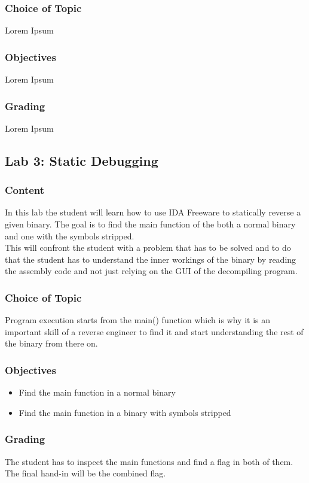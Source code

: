 \subsubsection*{Choice of Topic}
Lorem Ipsum
\subsubsection*{Objectives}
Lorem Ipsum
\subsubsection*{Grading}
Lorem Ipsum

\subsection{Lab 3: Static Debugging}
\subsubsection*{Content}
In this lab the student will learn how to use IDA Freeware to statically reverse a given binary. The goal is to find the main function of the both a normal binary and one with the symbols stripped. \\
This will confront the student with a problem that has to be solved and to do that the student has to understand the inner workings of the binary by reading the assembly code and not just relying on the GUI of the decompiling program.
\subsubsection*{Choice of Topic}
Program execution starts from the main() function which is why it is an important skill of a reverse engineer to find it and start understanding the rest of the binary from there on.
\subsubsection*{Objectives}
\begin{itemize}
    \item Find the main function in a normal binary
    \item Find the main function in a binary with symbols stripped
\end{itemize}
\subsubsection*{Grading}
The student has to inspect the main functions and find a flag in both of them. The final hand-in will be the combined flag.

